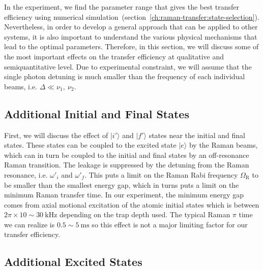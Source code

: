 In the experiment, we find the parameter range that gives the best transfer efficiency
using numerical simulation~(section~\ref{ch:raman-transfer:state-selection}).
Nevertheless, in order to develop a general approach that can be applied to other systems,
it is also important to understand the various physical mechanisms that lead
to the optimal parameters.
Therefore, in this section, we will discuss some of the most important effects
on the transfer efficiency at qualitative and semiquantitative level.
Due to experimental constraint, we will assume that the single photon detuning is
much smaller than the frequency of each individual beams, i.e. $\Delta\ll\nu_1,\ \nu_2$.

\subsection{Additional Initial and Final States}
\label{ch:raman-transfer:raman:extra-init-final}

First, we will discuss the effect of $|i'\rangle$ and $|f'\rangle$ states
near the initial and final states.
These states can be coupled to the excited state $|e\rangle$ by the Raman beams,
which can in turn be coupled to the initial and final states
by an off-resonance Raman transition.
The leakage is suppressed by the detuning from the Raman resonance,
i.e. $\omega'_i$ and $\omega'_f$.
This puts a limit on the Raman Rabi frequency $\Omega_{\mathrm{R}}$ to be smaller
than the smallest energy gap, which in turns puts a limit on the minimum Raman transfer time.
In our experiment, the minimum energy gap comes from axial motional excitation of
the atomic initial states which is between $2\pi\times10\sim30~\mathrm{kHz}$
depending on the trap depth used.
The typical Raman $\pi$ time we can realize is $0.5\sim5~\mathrm{ms}$ so this effect
is not a major limiting factor for our transfer efficiency.

\subsection{Additional Excited States}
\label{ch:raman-transfer:raman:extra-ext}

